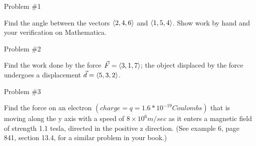 \setcounter{qcount}{0}

\begin{sleekbox}[palCoral]{Problem \#1}
    \begin{question}\leavevmode\par\medskip
       Find the angle between the vectors $\left\langle 2, 4, 6 \right\rangle$ and $\left\langle 1, 5, 4 \right\rangle$. Show work by hand and your verification on Mathematica.
    \end{question}\leavevmode\par\medskip
    \begin{solution}\leavevmode\par\medskip
    
    \end{solution}
    
\end{sleekbox}

\begin{sleekbox}[palCoral]{Problem \#2}
    \begin{question}\leavevmode\par\medskip
       Find the work done by the force $\Vec{F} = \left\langle 3, 1, 7 \right\rangle$; the object displaced by the force
undergoes a displacement $\Vec{d} = \left\langle 5, 3, 2 \right\rangle$.
    \end{question}\leavevmode\par\medskip
    \begin{solution}\leavevmode\par\medskip
    
    \end{solution}
    
\end{sleekbox}

\begin{sleekbox}[palCoral]{Problem \#3}
    \begin{question}\leavevmode\par\medskip
       Find the force on an electron $\left(charge = q = 1.6 * 10^{-19} Coulombs\right)$ that is moving
    along the y axis with a speed of $8\times10^6 m/sec$ as it enters a magnetic field of strength 1.1
    tesla, directed in the positive z direction. (See example 6, page 841, section 13.4, for a
    similar problem in your book.)
    \end{question}\leavevmode\par\medskip
    \begin{solution}\leavevmode\par\medskip
    
    \end{solution}
    
\end{sleekbox}

